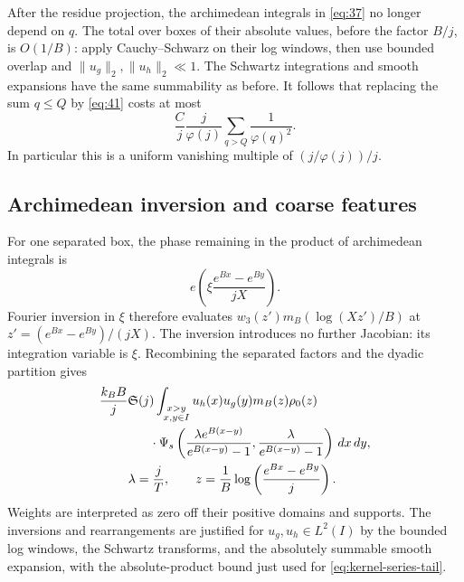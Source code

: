 After the residue projection, the archimedean integrals in
\eqref{eq:37} no longer depend on \(q\).  The total over boxes of
their absolute values, before the factor \(B/j\), is \(O(1/B)\):
apply Cauchy--Schwarz on their log windows, then use bounded overlap
and \(\|u_g\|_2,\|u_h\|_2\ll1\).  The Schwartz integrations and
smooth expansions have the same summability as before.  It follows
that replacing the sum \(q\le Q\) by \eqref{eq:41} costs at most
\begin{equation}\label{eq:kernel-series-tail}
 \frac Cj\frac j{\varphi(j)}
                  \sum_{q>Q}\frac1{\varphi(q)^2}.
\end{equation}
In particular this is a uniform vanishing multiple of
\((j/\varphi(j))/j\).

\subsection{Archimedean inversion and coarse features}

For one separated box, the phase remaining in the product of
archimedean integrals is
\[
 e\left(\xi\frac{e^{Bx}-e^{By}}{jX}\right).
\]
Fourier inversion in \(\xi\) therefore evaluates
\(w_3(z')m_B(\log(Xz')/B)\) at
\(z'=(e^{Bx}-e^{By})/(jX)\).  The inversion introduces no further
Jacobian: its integration variable is \(\xi\).  Recombining the
separated factors and the dyadic partition gives
\begin{equation}\label{eq:42}
 \begin{split}
 &\frac{k_BB}{j}\mathfrak S(j)
  \int_{\substack{x>y\\x,y\in I}}u_h(x)u_g(y)m_B(z)\rho_0(z)\\
 &\hspace{14mm}\cdot
  \Psi_s\left(
       \frac{\lambda e^{B(x-y)}}{e^{B(x-y)}-1},
       \frac{\lambda}{e^{B(x-y)}-1}\right)\,dx\,dy,\\
 &\hspace{8mm}\lambda=\frac jT,\qquad
 z=\frac1B\log\left(\frac{e^{Bx}-e^{By}}j\right).
 \end{split}
\end{equation}
Weights are interpreted as zero off their positive domains and
supports.  The inversions and rearrangements are justified for
\(u_g,u_h\in L^2(I)\) by the bounded log windows, the Schwartz
transforms, and the absolutely summable smooth expansion, with the
absolute-product bound just used for \eqref{eq:kernel-series-tail}.


